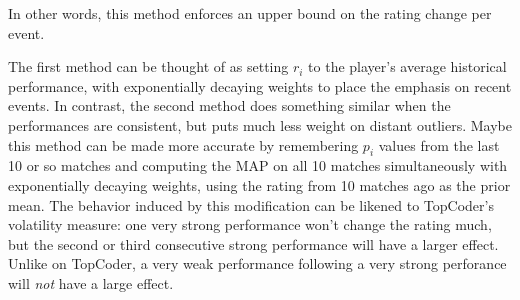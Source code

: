 \documentclass{article}
\begin{document}
In other words, this method enforces an upper bound on the rating change per event.

The first method can be thought of as setting $r_i$ to the player's average historical performance, with exponentially decaying weights to place the emphasis on recent events. In contrast, the second method does something similar when the performances are consistent, but puts much less weight on distant outliers. Maybe this method can be made more accurate by remembering $p_i$ values from the last 10 or so matches and computing the MAP on all 10 matches simultaneously with exponentially decaying weights, using the rating from 10 matches ago as the prior mean. The behavior induced by this modification can be likened to TopCoder's volatility measure: one very strong performance won't change the rating much, but the second or third consecutive strong performance will have a larger effect. Unlike on TopCoder, a very weak performance following a very strong perforance will \emph{not} have a large effect.
\end{document}
